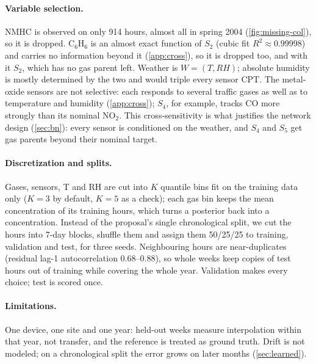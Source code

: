 \paragraph{Variable selection.} NMHC is observed on only 914 hours, almost all
in spring 2004 (\cref{fig:missing-col}), so it is dropped. C$_6$H$_6$ is an
almost exact function of $S_2$ (cubic fit $R^2 \approx 0.99998$) and carries
no information beyond it (\cref{app:cross}), so it is dropped too, and with it
$S_2$, which has no gas parent left. Weather is $W = (T, \mathit{RH})$;
absolute humidity is mostly determined by the two and would triple every
sensor CPT. The metal-oxide sensors are not selective: each responds to
several traffic gases as well as to temperature and humidity
(\cref{app:cross}); $S_4$, for example, tracks CO more strongly than its
nominal NO$_2$. This cross-sensitivity is what justifies the network design 
(\cref{sec:bn}): every sensor is conditioned on the weather, and $S_4$ and $S_5$ 
get gas parents beyond their nominal target.

\paragraph{Discretization and splits.} Gases, sensors, T and RH are cut into
$K$ quantile bins fit on the training data only ($K = 3$ by default, $K = 5$
as a check); each gas bin keeps the mean concentration of its training hours,
which turns a posterior back into a concentration. Instead of the proposal's
single chronological split, we cut the hours into 7-day blocks, shuffle them
and assign them 50/25/25 to training, validation and test, for three seeds.
Neighbouring hours are near-duplicates (residual lag-1 autocorrelation
0.68--0.88), so whole weeks keep copies of test hours out of training while
covering the whole year. Validation makes every choice; test is scored once.

\paragraph{Limitations.} One device, one site and one year: held-out weeks
measure interpolation within that year, not transfer, and the reference is
treated as ground truth. Drift is not modeled; on a chronological split the
error grows on later months (\cref{sec:learned}).